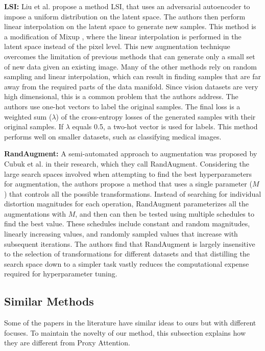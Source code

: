 \textbf{LSI: }
Liu et al. \cite{liuDataAugmentationLatent2018} propose a method LSI, that uses an adversarial autoencoder to impose a uniform distribution on the latent space. The authors then perform linear interpolation on the latent space to generate new samples. This method is a modification of Mixup \cite{zhangMixupEmpiricalRisk2018}, where the linear interpolation is performed in the latent space instead of the pixel level. This new augmentation technique overcomes the limitation of previous methods that can generate only a small set of new data given an existing image. Many of the other methods rely on random sampling and linear interpolation, which can result in finding samples that are far away from the required parts of the data manifold. Since vision datasets are very high dimensional, this is a common problem that the authors address. The authors use one-hot vectors to label the original samples. The final loss is a weighted sum ($\lambda$) of the cross-entropy losses of the generated samples with their original samples. If $\lambda$ equals 0.5, a two-hot vector is used for labels. This method performs well on smaller datasets, such as classifying medical images.

\textbf{RandAugment: }
A semi-automated approach to augmentation was proposed by Cubuk et al. \cite{cubukRandaugmentPracticalAutomated2020} in their research, which they call RandAugment. Considering the large search spaces involved when attempting to find the best hyperparameters for augmentation, the authors propose a method that uses a single parameter ($M$) that controls all the possible transformations. Instead of searching for individual distortion magnitudes for each operation, RandAugment parameterizes all the augmentations with $M$, and then can then be tested using multiple schedules to find the best value. These schedules include constant and random magnitudes, linearly increasing values, and randomly sampled values that increase with subsequent iterations. The authors find that RandAugment is largely insensitive to the selection of transformations for different datasets and that distilling the search space down to a simpler task vastly reduces the computational expense required for hyperparameter tuning.


\subsection{Similar Methods}
Some of the papers in the literature have similar ideas to ours but with different focuses. To maintain the novelty of our method, this subsection explains how they are different from Proxy Attention.

